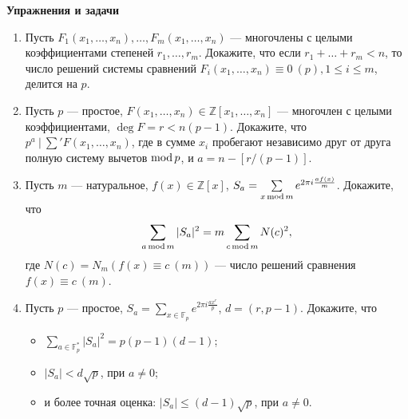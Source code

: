 \noindent\textbf{Упражнения и задачи}

\begin{enumerate}[topsep=0pt]
    
    \item Пусть $F_1(x_1,\dots, x_n), \dots, F_m(x_1,\dots, x_n)$ --- многочлены с целыми коэффициентами степеней $r_1, \dots, r_m$. Докажите, что если $r_1+\dots+r_m < n$, то число решений системы сравнений $F_i(x_1,\dots, x_n) \equiv 0\ (p), 1\leqslant i \leqslant m$, делится на $p$. %
    
    \item Пусть $p$ --- простое, $F(x_1, \dots, x_n)\in \mathbb{Z}[x_1,\dots,x_n]$ --- многочлен с целыми коэффициентами, $\deg F = r < n(p-1)$. Докажите, что $p^a\ |\ \sum' F(x_1, \dots, x_n)$, где в сумме $x_i$ пробегают независимо друг от друга полную систему вычетов $\operatorname{mod} p$, и $a=n-[r/(p-1)]$. %

    \item Пусть $m$ --- натуральное, $f(x) \in \mathbb{Z}[x]$, $S_a = \sum\limits_{x \operatorname{mod} m} e^{2\pi i \frac{af(x)}{m}}$. Докажите, что
    $$
        \sum\limits_{a \operatorname{mod} m} |S_a|^2 = m \sum\limits_{c \operatorname{mod} m} N(c)^2,
    $$
    где $N(c) = N_m\left(f(x) \equiv c\ (m)\right)$ --- число решений сравнения $f(x) \equiv c\ (m)$.

    \item Пусть $p$ --- простое, $S_a = \sum\limits_{x \in \mathbb{F}_p} e^{2\pi i \frac{a x^r}{p}}$, $d=(r,p-1)$. Докажите, что 
    \begin{itemize}[noitemsep,topsep=0pt]
        \item $\sum\limits_{a \in \mathbb{F}_p^*} |S_a|^2 = p(p-1)(d-1)$;
        \item $|S_a| < d \sqrt{p}$, при $a \neq 0$;
        \item и более точная оценка: $|S_a| \leqslant (d-1) \sqrt{p}$, при $a \neq 0$.
    \end{itemize} %


\end{enumerate}
